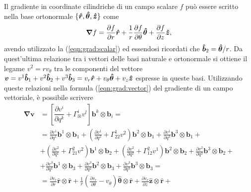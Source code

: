 \begin{example}
 Il gradiente in coordinate cilindriche di un campo scalare $f$ può essere scritto nella base ortonormale $\{ \bm{\hat{r}}, \bm{\hat{\theta}},\bm{\hat{z}} \}$ come
\begin{equation}
 \bm{\nabla} f = \dfrac{\partial f}{\partial r} \bm{\hat{r}} + \dfrac{1}{r}\dfrac{\partial f}{\partial \theta} \bm{\hat{\theta}} +
   \dfrac{\partial f}{\partial z} \bm{\hat{z}} ,
\end{equation}
 avendo utilizzato la (\ref{eqn:grad:scalar}) ed essendosi ricordati che $\bm{\hat{b}}_2 = \bm{\hat{\theta}} / r$. Da quest'ultima relazione tra i vettori delle basi naturale e ortonormale si ottiene il legame $v^2 = r v_{\theta}$ tra le componenti del vettore $\bm{v} = v^1 \bm{\hat{b}}_1 + v^2 \bm{\hat{b}}_2 + v^3 \bm{\hat{b}}_3 = v_r \bm{\hat{r}} + v_{\theta} \bm{\hat{\theta}} + v_z \bm{\hat{z}}$ espresse in queste basi. Utilizzando queste relazioni nella formula (\ref{eqn:grad:vector}) del gradiente di un campo vettoriale, è possibile scrivere
\begin{equation}
\begin{aligned}
    \bm{\nabla} \bm{v} & = \left[ \dfrac{\partial v^i}{\partial q^k} + \Gamma_{lk}^i v^l \right] \bm{b}^k \otimes \bm{b}_i = \\
     & = \frac{\partial v^1}{\partial q^1}                                   \bm{b}^1 \otimes \bm{b}_1   + 
        \left( \frac{\partial v^1}{\partial q^2} + \Gamma_{22}^1 v^2 \right) \bm{b}^2 \otimes \bm{b}_1   + 
        \frac{\partial v^1}{\partial q^3}                                    \bm{b}^3 \otimes \bm{b}_1   + \\
     & + \left( \frac{\partial v^2}{\partial q^1} + \Gamma_{21}^2 v^2 \right)\bm{b}^1 \otimes \bm{b}_2   + 
        \left( \frac{\partial v^2}{\partial q^2} + \Gamma_{12}^2 v^1 \right) \bm{b}^2 \otimes \bm{b}_2   + 
        \frac{\partial v^2}{\partial q^3}                                    \bm{b}^3 \otimes \bm{b}_2   + \\
     & + \frac{\partial v^3}{\partial q^1}                                   \bm{b}^1 \otimes \bm{b}_3   + 
        \frac{\partial v^3}{\partial q^2}                                    \bm{b}^2 \otimes \bm{b}_3   + 
        \frac{\partial v^3}{\partial q^3}                                    \bm{b}^3 \otimes \bm{b}_3   = \\
     & = \frac{\partial v_r}{\partial r}                                           \bm{\hat{r}}      \otimes \bm{\hat{r}}       + 
        \frac{1}{r}\left( \frac{\partial v_r}{\partial \theta} - v_\theta \right)  \bm{\hat{\theta}} \otimes \bm{\hat{r}}       + 
        \frac{\partial v_r}{\partial z}                                            \bm{\hat{z}}      \otimes \bm{\hat{r}}       + \\

\end{aligned}
\end{equation}
\end{example}
